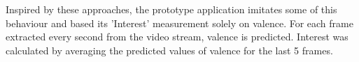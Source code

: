 

Inspired by these approaches, the prototype application imitates some of this behaviour and based its 'Interest' measurement solely on valence. For each frame extracted every second from the video stream, valence is predicted. Interest was calculated by averaging the predicted values of valence for the last 5 frames.

